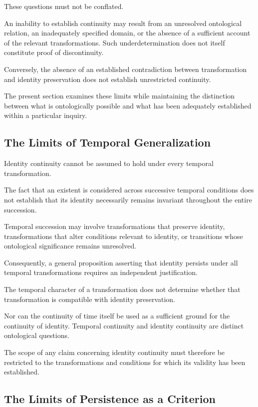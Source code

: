 These questions must not be conflated.

An inability to establish continuity may result from
an unresolved ontological relation, an inadequately
specified domain, or the absence of a sufficient
account of the relevant transformations. Such
underdetermination does not itself constitute proof
of discontinuity.

Conversely, the absence of an established contradiction
between transformation and identity preservation
does not establish unrestricted continuity.

The present section examines these limits while
maintaining the distinction between what is
ontologically possible and what has been adequately
established within a particular inquiry.

\subsection{The Limits of Temporal Generalization}

Identity continuity cannot be assumed to hold under
every temporal transformation.

The fact that an existent is considered across
successive temporal conditions does not establish
that its identity necessarily remains invariant
throughout the entire succession.

Temporal succession may involve transformations
that preserve identity, transformations that alter
conditions relevant to identity, or transitions
whose ontological significance remains unresolved.

Consequently, a general proposition asserting that
identity persists under all temporal transformations
requires an independent justification.

The temporal character of a transformation does
not determine whether that transformation is
compatible with identity preservation.

Nor can the continuity of time itself be used
as a sufficient ground for the continuity of
identity. Temporal continuity and identity continuity
are distinct ontological questions.

The scope of any claim concerning identity continuity
must therefore be restricted to the transformations
and conditions for which its validity has been
established.

\subsection{The Limits of Persistence as a Criterion}

